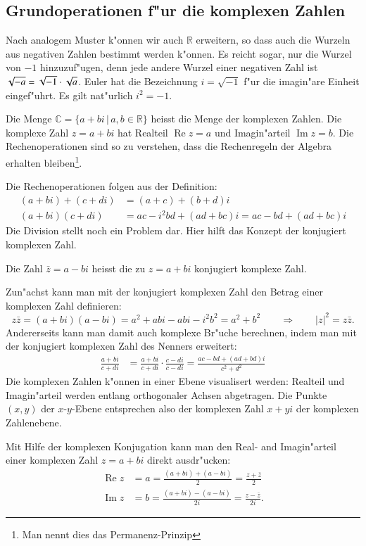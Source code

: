 \subsection{Grundoperationen f"ur die komplexen Zahlen}
Nach analogem Muster k"onnen wir auch $\mathbb R$ erweitern, so dass auch
die Wurzeln aus negativen Zahlen bestimmt werden k"onnen. Es reicht
sogar, nur die Wurzel von $-1$ hinzuzuf"ugen, denn jede andere Wurzel
einer negativen Zahl ist $\sqrt{-a}=\sqrt{-1}\cdot\sqrt{\mathstrut a}$.
Euler hat die Bezeichnung $i=\sqrt{-1}$ f"ur die imagin"are Einheit eingef"uhrt.
Es gilt nat"urlich $i^2=-1$.

\begin{definition}
Die Menge $\mathbb C=\{a+bi\,|\,a,b\in\mathbb R\}$ heisst die Menge der
komplexen Zahlen. Die komplexe Zahl $z=a+bi$ hat
Realteil $\operatorname{Re}z=a$ und Imagin"arteil $\operatorname{Im}z=b$.
Die Rechenoperationen sind so zu verstehen, dass die Rechenregeln
der Algebra erhalten bleiben\footnote{Man nennt dies das Permanenz-Prinzip}.
\end{definition}

Die Rechenoperationen folgen aus der Definition:
\begin{align*}
(a+bi)+(c+di)&=(a+c)+(b+d)i\\
(a+bi)(c+di)&=ac-i^2bd+(ad+bc)i=ac-bd+(ad+bc)i
\end{align*}
Die Division stellt noch ein Problem dar. Hier hilft das Konzept der
konjugiert komplexen Zahl.

\begin{definition}
Die Zahl $\bar z=a-bi$ heisst die zu $z=a+bi$ konjugiert komplexe Zahl.
\end{definition}

Zun"achst kann man mit der konjugiert komplexen Zahl den Betrag einer
komplexen Zahl definieren:
\[
z\bar z=(a+bi)(a-bi)=a^2+abi-abi-i^2b^2=a^2+b^2\qquad\Rightarrow\qquad
|z|^2=z\bar z.
\]
Andererseits kann man damit auch komplexe Br"uche berechnen, indem man
mit der konjugiert komplexen Zahl des Nenners erweitert:
\begin{align*}
\frac{a+bi}{c+di}&=
\frac{a+bi}{c+di}
\cdot
\frac{c-di}{c-di}=\frac{ac-bd+(ad+bd)i}{c^2+d^2}
\end{align*}
Die komplexen Zahlen k"onnen in einer Ebene visualisert werden: 
Realteil und Imagin"arteil werden entlang orthogonaler Achsen abgetragen.
Die Punkte $(x,y)$ der $x$-$y$-Ebene entsprechen also der komplexen Zahl
$x+yi$ der komplexen Zahlenebene.

Mit Hilfe der komplexen Konjugation kann man den Real- and Imagin"arteil
einer komplexen Zahl $z=a+bi$ direkt ausdr"ucken:
\begin{align}
\operatorname{Re}z 
&=
a=\frac{(a+bi)+(a-bi)}2=\frac{z+\bar z}2
\label{skript:realteil-formel}
\\
\operatorname{Im}z
&=
b=\frac{(a+bi)-(a-bi)}{2i}=\frac{z-\bar z}{2i}.
\label{skript:imaginaerteil-formel}
\end{align}

